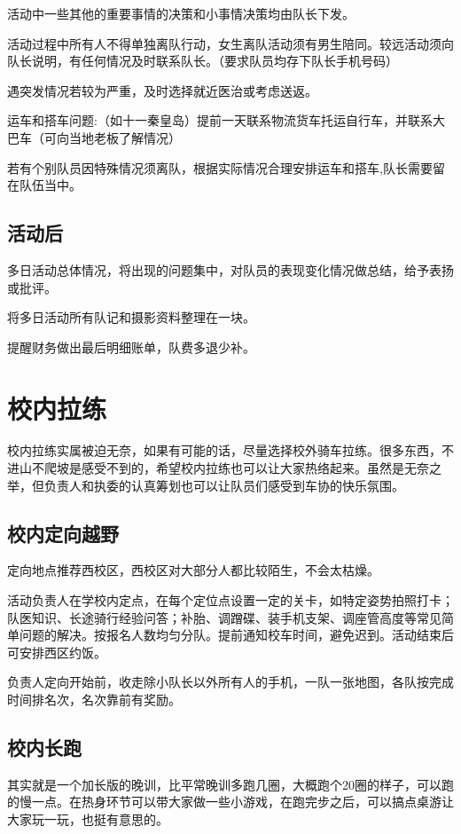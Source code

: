 \documentclass{ctexbook}
\begin{document}
活动中一些其他的重要事情的决策和小事情决策均由队长下发。

活动过程中所有人不得单独离队行动，女生离队活动须有男生陪同。较远活动须向队长说明，有任何情况及时联系队长。（要求队员均存下队长手机号码）

遇突发情况若较为严重，及时选择就近医治或考虑送返。

运车和搭车问题:（如十一秦皇岛）提前一天联系物流货车托运自行车，并联系大巴车（可向当地老板了解情况）

若有个别队员因特殊情况须离队，根据实际情况合理安排运车和搭车,队长需要留在队伍当中。

\subsection{活动后}

多日活动总体情况，将出现的问题集中，对队员的表现变化情况做总结，给予表扬或批评。

将多日活动所有队记和摄影资料整理在一块。

提醒财务做出最后明细账单，队费多退少补。


\section{校内拉练}
校内拉练实属被迫无奈，如果有可能的话，尽量选择校外骑车拉练。很多东西，不进山不爬坡是感受不到的，希望校内拉练也可以让大家热络起来。虽然是无奈之举，但负责人和执委的认真筹划也可以让队员们感受到车协的快乐氛围。

\subsection{校内定向越野}
定向地点推荐西校区，西校区对大部分人都比较陌生，不会太枯燥。

活动负责人在学校内定点，在每个定位点设置一定的关卡，如特定姿势拍照打卡；队医知识、长途骑行经验问答；补胎、调蹭碟、装手机支架、调座管高度等常见简单问题的解决。按报名人数均匀分队。提前通知校车时间，避免迟到。活动结束后可安排西区约饭。

负责人定向开始前，收走除小队长以外所有人的手机，一队一张地图，各队按完成时间排名次，名次靠前有奖励。
\subsection{校内长跑}
其实就是一个加长版的晚训，比平常晚训多跑几圈，大概跑个20圈的样子，可以跑的慢一点。在热身环节可以带大家做一些小游戏，在跑完步之后，可以搞点桌游让大家玩一玩，也挺有意思的。
\end{document}
